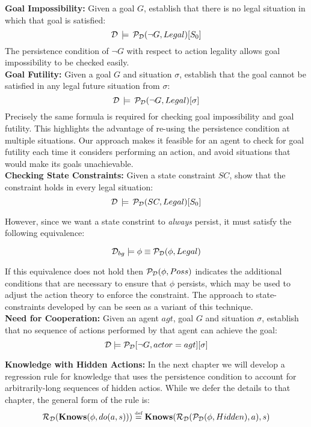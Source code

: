 \textbf{Goal Impossibility:} Given a goal $G$, establish that there
is no legal situation in which that goal is satisfied:\[
\mathcal{D}\,\models\,\mathcal{P}_{\mathcal{D}}(\neg G,Legal)[S_{0}]\]
 The persistence condition of $\neg G$ with respect to action legality
allows goal impossibility to be checked easily.\\


\textbf{Goal Futility:} Given a goal $G$ and situation $\sigma$,
establish that the goal cannot be satisfied in any legal future situation
from $\sigma$:\[
\mathcal{D}\,\models\,\mathcal{P}_{\mathcal{D}}(\neg G,Legal)[\sigma]\]
 Precisely the same formula is required for checking goal impossibility
and goal futility. This highlights the advantage of re-using the persistence
condition at multiple situations. Our approach makes it feasible for
an agent to check for goal futility each time it considers performing
an action, and avoid situations that would make its goals unachievable.\\


\textbf{Checking State Constraints:} Given a state constraint $SC$,
show that the constraint holds in every legal situation:\[
\mathcal{D}\,\models\,\mathcal{P}_{\mathcal{D}}(SC,Legal)[S_{0}]\]


However, since we want a state constrint to \emph{always} persist,
it must satisfy the following equivalence:

\[
\mathcal{D}_{bg}\models\phi\equiv\mathcal{P}_{\mathcal{D}}(\phi,Legal)\]


If this equivalence does not hold then $\mathcal{P}_{\mathcal{D}}(\phi,Poss)$
indicates the additional conditions that are necessary to ensure that
$\phi$ persists, which may be used to adjust the action theory to
enforce the constraint. The approach to state-constraints developed
by \citet{Lin94-StateConstraints} can be seen as a variant of this
technique.\\


\textbf{Need for Cooperation:} Given an agent $agt$, goal $G$ and
situation $\sigma$, establish that no sequence of actions performed
by that agent can achieve the goal:\[
\mathcal{D}\models\mathcal{P}_{\mathcal{D}}[\neg G,actor=agt][\sigma]\]


\textbf{Knowledge with Hidden Actions:} In the next chapter we will
develop a regression rule for knowledge that uses the persistence
condition to account for arbitrarily-long sequences of hidden actios.
While we defer the details to that chapter, the general form of the
rule is:\[
\mathcal{R}_{\mathcal{D}}(\mathbf{Knows}(\phi,do(a,s)))\stackrel{\mbox{\tiny def}}{=}\mathbf{Knows}(\mathcal{R}_{\mathcal{D}}(\mathcal{P}_{\mathcal{D}}(\phi,Hidden),a),s)\]



